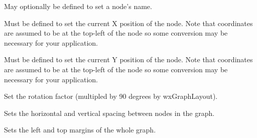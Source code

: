 

May optionally be defined to set a node's name.

\label{setnodex}


Must be defined to set the current X position of the node. Note that
coordinates are assumed to be at the top-left of the node so some conversion
may be necessary for your application.

\label{setnodey}


Must be defined to set the current Y position of the node. Note that
coordinates are assumed to be at the top-left of the node so some conversion
may be necessary for your application.



Set the rotation factor (multipled by 90 degrees by wxGraphLayout).



Sets the horizontal and vertical spacing between nodes in the graph.

\label{setmargins}


Sets the left and top margins of the whole graph.

